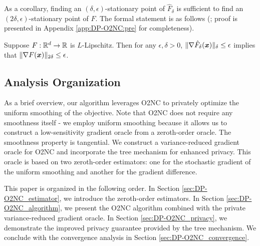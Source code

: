 As a corollary, finding an $(\delta,\epsilon)$-stationary point of $\hat F_\delta$ is sufficient to find an $(2\delta,\epsilon)$-stationary point of $F$. The formal statement is as follows (\citet[Lemma 4]{kornowski2023algorithm}; proof is presented in Appendix \ref{app:DP-O2NC:pre} for completeness). 

\begin{corollary}
\label{cor:DP-O2NC:smooth-reduction}
Suppose $F:\mathbb R^d\to\mathbb R$ is $L$-Lipschitz.
Then for any $\epsilon, \delta > 0$, $\|\nabla \hat F_\delta({\boldsymbol{x}})\|_\delta \le \epsilon$ implies that $\|\nabla F({\boldsymbol{x}})\|_{2\delta} \le \epsilon$.
\end{corollary}

\subsection{Analysis Organization}

As a brief overview, our algorithm leverages O2NC to privately optimize the uniform smoothing of the objective. Note that O2NC does not require any smoothness itself - we employ uniform smoothing because it allows us to construct a low-sensitivity gradient oracle from a zeroth-order oracle. The smoothness property is tangential. We construct a variance-reduced gradient oracle for O2NC and incorporate the tree mechanism for enhanced privacy. This oracle is based on two zeroth-order estimators: one for the stochastic gradient of the uniform smoothing and another for the gradient difference.

This paper is organized in the following order. In Section \ref{sec:DP-O2NC_estimator}, we introduce the zeroth-order estimators. In Section \ref{sec:DP-O2NC_algorithm}, we present the O2NC algorithm combined with the private variance-reduced gradient oracle. In Section \ref{sec:DP-O2NC_privacy}, we demonstrate the improved privacy guarantee provided by the tree mechanism. We conclude with the convergence analysis in Section \ref{sec:DP-O2NC_convergence}.